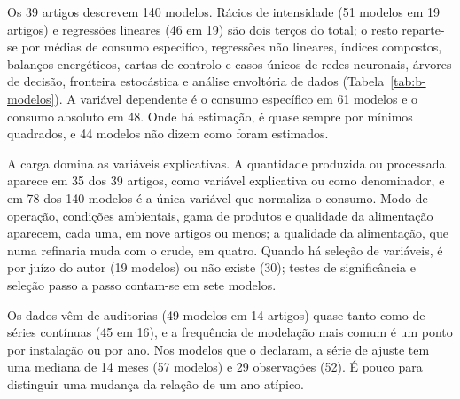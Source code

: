 Os 39 artigos descrevem 140 modelos. Rácios de intensidade (51 modelos em
19 artigos) e regressões lineares (46 em 19) são dois terços do total; o
resto reparte-se por médias de consumo específico, regressões não lineares,
índices compostos, balanços energéticos, cartas de controlo e casos únicos
de redes neuronais, árvores de decisão, fronteira estocástica e análise
envoltória de dados (Tabela~\ref{tab:b-modelos}). A variável dependente é o
consumo específico em 61 modelos e o consumo absoluto em 48. Onde há
estimação, é quase sempre por mínimos quadrados, e 44 modelos não dizem como
foram estimados.

A carga domina as variáveis explicativas. A quantidade produzida ou
processada aparece em 35 dos 39 artigos, como variável explicativa ou como
denominador, e em 78 dos 140 modelos é a única variável que normaliza o
consumo. Modo de operação, condições ambientais, gama de produtos e
qualidade da alimentação aparecem, cada uma, em nove artigos ou menos; a
qualidade da alimentação, que numa refinaria muda com o crude, em quatro.
Quando há seleção de variáveis, é por juízo do autor (19 modelos) ou não
existe (30); testes de significância e seleção passo a passo contam-se em
sete modelos.

Os dados vêm de auditorias (49 modelos em 14 artigos) quase tanto como de
séries contínuas (45 em 16), e a frequência de modelação mais comum é um
ponto por instalação ou por ano. Nos modelos que o declaram, a série de
ajuste tem uma mediana de 14 meses (57 modelos) e 29 observações (52).
É pouco para distinguir uma mudança da relação de um ano atípico.

